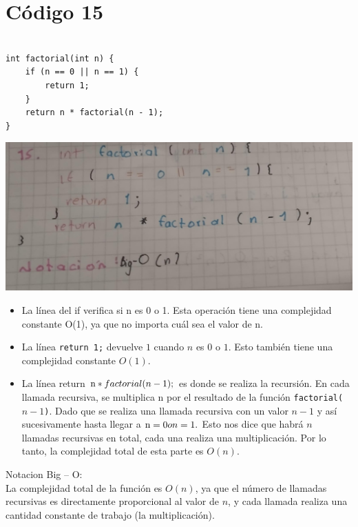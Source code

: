 \documentclass[a4paper,onecolumn,10pt]{article}
\begin{document}
\section{Código 15}

\begin{verbatim}

int factorial(int n) {
    if (n == 0 || n == 1) {
        return 1;
    }
    return n * factorial(n - 1);
}

\end{verbatim}
\includegraphics[width=1\linewidth]{imagenes/punto 15.jpeg}

\begin{itemize}

\item La línea del if  verifica si n es 0 o 1. Esta operación tiene una complejidad constante O(1), ya que no importa cuál sea el valor de n.

\item La línea \texttt{return 1;} devuelve $1$ cuando $n$ es $0$ o $1$. Esto también tiene una complejidad constante $O(1)$.

\item La línea return $\text n * factorial(n - 1);$ es donde se realiza la recursión. En cada llamada recursiva, se multiplica n por el resultado de la función \texttt{factorial($n - 1$)}. Dado que se realiza una llamada recursiva con un valor $n - 1$ y así sucesivamente hasta llegar a $\text n = 0 o n = 1.$ Esto nos dice que habrá $n$ llamadas recursivas en total, cada una realiza una multiplicación. Por lo tanto, la complejidad total de esta parte es $O(n)$.

\end{itemize}

Notacion Big – O:\\

La complejidad total de la función es $O(n)$, ya que el número de llamadas recursivas es directamente proporcional al valor de $n$, y cada llamada realiza una cantidad constante de trabajo (la multiplicación).
\end{document}
